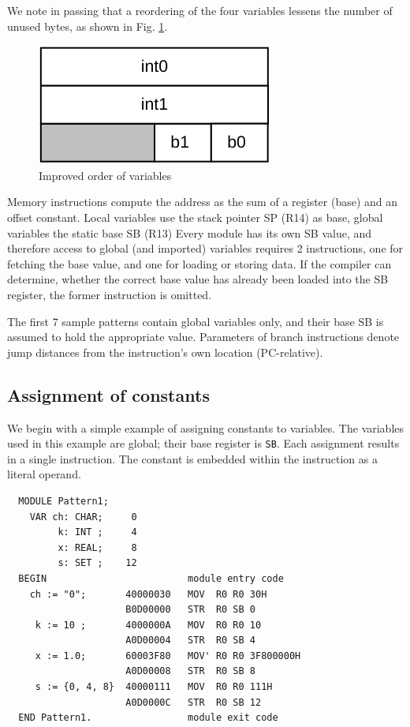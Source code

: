 We note in passing that a reordering of the four variables lessens the number of unused bytes, as
shown in Fig. \ref{fig:varorder}.
\begin{figure}[h!]
  \centering
  \includegraphics[width=.25\textwidth]{i/C/3.png}
  \caption{Improved order of variables}
  \label{fig:varorder}
\end{figure}

Memory instructions compute the address as the sum of a register (base) and an offset constant.
Local variables use the stack pointer SP (R14) as base, global variables the static base SB (R13)
Every module has its own SB value, and therefore access to global (and imported) variables
requires 2 instructions, one for fetching the base value, and one for loading or storing data. If the
compiler can determine, whether the correct base value has already been loaded into the SB
register, the former instruction is omitted.

The first 7 sample patterns contain global variables only, and their base SB is assumed to hold the
appropriate value. Parameters of branch instructions denote jump distances from the instruction's
own location (PC-relative).

\subsection{Assignment of constants}
\label{ssc:ptn1}
We begin with a simple example of assigning constants to variables. The variables used in this example
are global; their base register is \verb|SB|. Each assignment results in a single instruction.
The constant is embedded within the instruction as a literal operand.
\begin{verbatim}
  MODULE Pattern1;
    VAR ch: CHAR;     0
         k: INT ;     4
         x: REAL;     8
         s: SET ;    12
  BEGIN                         module entry code    
    ch := "0";       40000030   MOV  R0 R0 30H
                     B0D00000   STR  R0 SB 0
     k := 10 ;       4000000A   MOV  R0 R0 10
                     A0D00004   STR  R0 SB 4
     x := 1.0;       60003F80   MOV' R0 R0 3F800000H
                     A0D00008   STR  R0 SB 8
     s := {0, 4, 8}  40000111   MOV  R0 R0 111H
                     A0D0000C   STR  R0 SB 12
  END Pattern1.                 module exit code
\end{verbatim}

